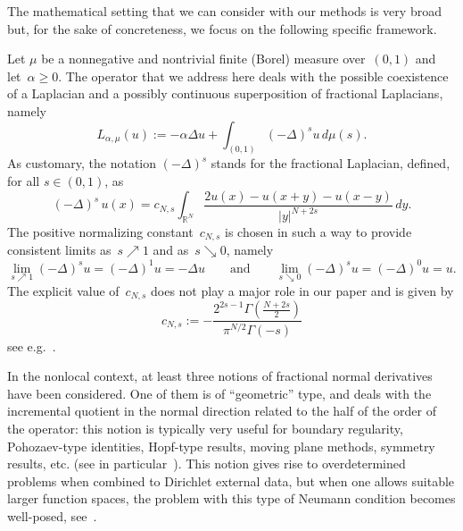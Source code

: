 \documentclass[12pt,a4paper,intlimits,sumlimits]{amsart}
\def \R {\mathbb{R}}
\theoremstyle{definition}
\theoremstyle{plain}
\numberwithin{equation}{section}
\renewcommand{\ge}{\geqslant}
\begin{document}
The mathematical setting that we can consider with our methods is  very broad but, for the sake of concreteness, we focus on the following specific framework.


Let $\mu$ be a nonnegative and nontrivial finite (Borel) measure over~$(0, 1)$ and
let~$\alpha \ge 0$. The operator that we address here deals with the possible coexistence of a Laplacian and a possibly continuous superposition of fractional Laplacians, namely
\begin{equation}\label{ELLE}
L_{\alpha, \mu} (u):= -\alpha\Delta u +\int_{(0, 1)} (-\Delta)^s u\, d\mu(s).
\end{equation}
As customary, the notation $(-\Delta)^s$ stands for the fractional Laplacian, defined, for all $s\in (0, 1)$, as 
\begin{equation}\label{deflaplacianofrazionario}
(- \Delta)^s\, u(x) = c_{N,s}\int_{\R^N} \frac{2u(x) - u(x+y)-u(x-y)}{|y|^{N+2s}}\, dy.
\end{equation}
The positive normalizing constant~$c_{N,s}$ is chosen in such a way to provide
consistent limits as~$s\nearrow1$ and as~$s\searrow0$, namely
\[
\lim_{s\nearrow1}(-\Delta)^su=(-\Delta)^1u=-\Delta u
\qquad{\mbox{and}}\qquad
\lim_{s\searrow0}(-\Delta)^s u=(-\Delta)^0u=u.
\]
The explicit value of~$c_{N,s}$ does not play a major role in our paper and is given by
$$ c_{N,s} := -\frac{2^{2s-1}\Gamma(\frac{N+2s}2)}{\pi^{N/2}\Gamma(-s)} $$
see e.g.~\cite[Definition~1.1]{2024arXiv241118238A}. 

In the nonlocal context, at least three notions of fractional normal derivatives have been
considered. One of them is of ``geometric'' type, and deals with the incremental quotient in the normal direction related to the half of the order of the operator: this notion is typically
very useful for boundary regularity, Pohozaev-type identities, Hopf-type results, moving plane methods, symmetry results, etc. (see in particular~\cite{MR3168912, MR3211861, MR3177650, MR3395749, MR3937999}).
This notion gives rise
to overdetermined problems when combined to Dirichlet external data,
but when one allows suitable larger function spaces, the problem with this type of Neumann condition becomes well-posed, see~\cite{MR3293447, MR3920522}.
\end{document}
